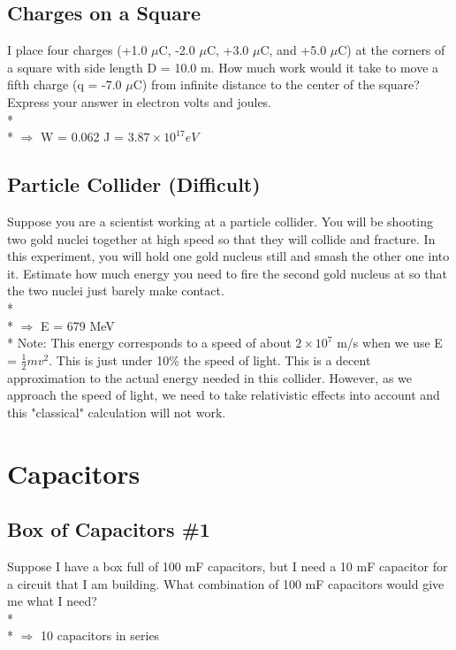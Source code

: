 \documentclass[11pt]{article}
\begin{document}
\subsection{Charges on a Square}
I place four charges (+1.0 $\mu$C, -2.0 $\mu$C, +3.0 $\mu$C, and +5.0 $\mu$C) at the corners of a square with side length D = 10.0 m.  How much work would it take to move a fifth charge (q = -7.0 $\mu$C) from infinite distance to the center of the square?  Express your answer in electron volts and joules.\\* \\*
$\Rightarrow$ W = 0.062 J = $3.87 \times 10^{17} eV$

\subsection{Particle Collider (Difficult)}
Suppose you are a scientist working at a particle collider.  You will be shooting two gold nuclei together at high speed so that they will collide and fracture.  In this experiment, you will hold one gold nucleus still and smash the other one into it.  Estimate how much energy you need to fire the second gold nucleus at so that the two nuclei just barely make contact.\\*\\*
$\Rightarrow$ E = 679 MeV\\*
Note: This energy corresponds to a speed of about $2\times 10^7$ m/s when we use E = $\frac{1}{2}mv^2$.  This is just under 10\% the speed of light.  This is a decent approximation to the actual energy needed in this collider.  However, as we approach the speed of light, we need to take relativistic effects into account and this "classical" calculation will not work.


\pagebreak
\section{Capacitors}
\vspace{10pt}

\subsection{Box of Capacitors \#1}
Suppose I have a box full of 100 mF capacitors, but I need a 10 mF capacitor for a circuit that I am building.  What combination of 100 mF capacitors would give me what I need?\\* \\*
$\Rightarrow$ 10 capacitors in series
\end{document}
